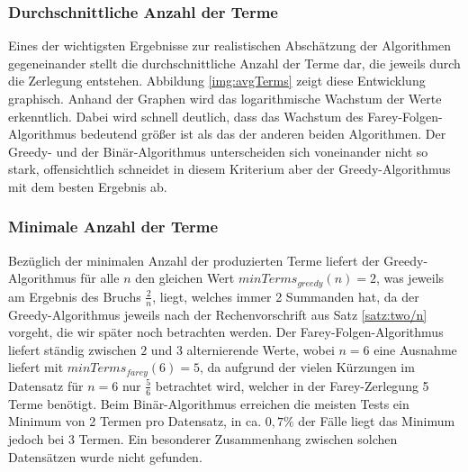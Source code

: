 \subsubsection{Durchschnittliche Anzahl der Terme}
Eines der wichtigsten Ergebnisse zur realistischen Abschätzung der Algorithmen gegeneinander stellt die durchschnittliche Anzahl der Terme dar, die jeweils durch die Zerlegung entstehen. Abbildung \ref{img:avgTerms} zeigt diese Entwicklung graphisch.
Anhand der Graphen wird das logarithmische Wachstum der Werte erkenntlich. Dabei wird schnell deutlich, dass das Wachstum des Farey-Folgen-Algorithmus bedeutend größer ist als das der anderen beiden Algorithmen. Der Greedy- und der Binär-Algorithmus unterscheiden sich voneinander nicht so stark, offensichtlich schneidet in diesem Kriterium aber der Greedy-Algorithmus mit dem besten Ergebnis ab.

\subsubsection{Minimale Anzahl der Terme}
Bezüglich der minimalen Anzahl der produzierten Terme liefert der Greedy-Algorithmus für alle $n$ den gleichen Wert $minTerms_{greedy}(n) = 2$, was jeweils am Ergebnis des Bruchs $\frac{2}{n}$, liegt, welches immer 2 Summanden hat, da der Greedy-Algorithmus jeweils nach der Rechenvorschrift aus Satz \ref{satz:two/n} vorgeht, die wir später noch betrachten werden. Der Farey-Folgen-Algorithmus liefert ständig zwischen $2$ und $3$ alternierende Werte, wobei $n=6$ eine Ausnahme liefert mit $minTerms_{farey}(6) = 5$, da aufgrund der vielen Kürzungen im Datensatz für $n=6$ nur $\frac{5}{6}$ betrachtet wird, welcher in der Farey-Zerlegung 5 Terme benötigt. Beim Binär-Algorithmus erreichen die meisten Tests ein Minimum von 2 Termen pro Datensatz, in ca. $0,7\%$ der Fälle liegt das Minimum jedoch bei 3 Termen. Ein besonderer Zusammenhang zwischen solchen Datensätzen wurde nicht gefunden.

